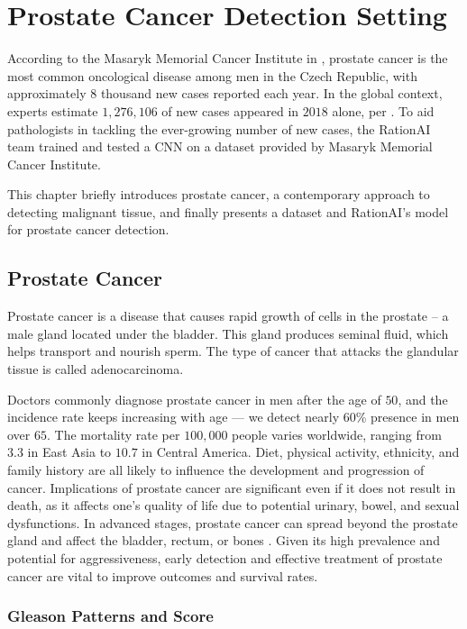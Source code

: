 \chapter{Prostate Cancer Detection Setting}

According to the Masaryk Memorial Cancer Institute in \cite{mmci-prostate-cancer}, prostate cancer is the most common oncological disease among men in the Czech Republic, with approximately $8$ thousand new cases reported each year.
In the global context, experts estimate $1,276,106$ of new cases appeared in $2018$ alone, per \cite{world-prostate-cancer}.
To aid pathologists in tackling the ever-growing number of new cases, the RationAI team trained and tested a CNN on a dataset provided by Masaryk Memorial Cancer Institute.

This chapter briefly introduces prostate cancer, a contemporary approach to detecting malignant tissue, and finally presents a dataset and RationAI's model for prostate cancer detection.

\section{Prostate Cancer}

Prostate cancer is a disease that causes rapid growth of cells in the prostate -- a male gland located under the bladder.
This gland produces seminal fluid, which helps transport and nourish sperm.
The type of cancer that attacks the glandular tissue is called adenocarcinoma.

Doctors commonly diagnose prostate cancer in men after the age of $50$, and the incidence rate keeps increasing with age --- we detect nearly $60$\% presence in men over $65$.
The mortality rate per $100,000$ people varies worldwide, ranging from $3.3$ in East Asia to $10.7$ in Central America. Diet, physical activity, ethnicity, and family history are all likely to influence the development and progression of cancer.
Implications of prostate cancer are significant even if it does not result in death, as it affects one's quality of life due to potential urinary, bowel, and sexual dysfunctions.
In advanced stages, prostate cancer can spread beyond the prostate gland and affect the bladder, rectum, or bones \cite{world-prostate-cancer}.
Given its high prevalence and potential for aggressiveness, early detection and effective treatment of prostate cancer are vital to improve outcomes and survival rates.

\subsection*{Gleason Patterns and Score}

